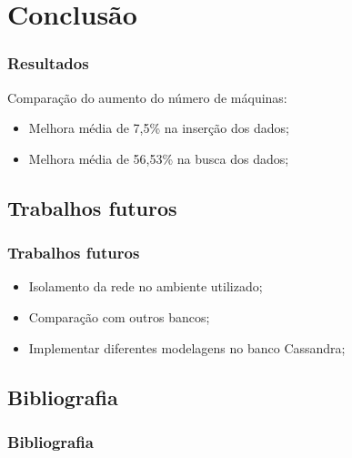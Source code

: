 \documentclass[brazil]{beamer}
\begin{document}
\section{Conclusão}
\begin{frame}
\frametitle{Resultados}
	Comparação do aumento do número de máquinas:
\begin{itemize}
	\item Melhora média de 7,5\% na inserção dos dados;
	\item Melhora média de 56,53\% na busca dos dados;
\end{itemize}
\end{frame}

\subsection{Trabalhos futuros}
\begin{frame}
\frametitle{Trabalhos futuros}
\begin{itemize}
	\item Isolamento da rede no ambiente utilizado;
	\item Comparação com outros bancos;
	\item Implementar diferentes modelagens no banco Cassandra;
\end{itemize}


\end{frame}

\subsection{Bibliografia}
\begin{frame}
\frametitle{Bibliografia}\footnotesize
  \nocite{}
  
  
\end{frame}


\end{document}
